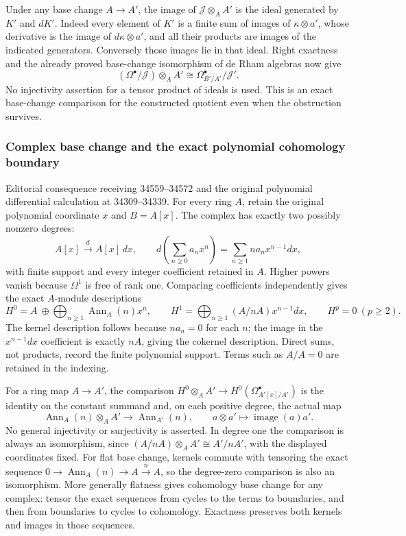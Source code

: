 Under any base change \(A\to A'\), the image of \(\mathcal J\otimes_A A'\) is the ideal generated by \(K'\) and \(dK'\). Indeed every element of \(K'\) is a finite sum of images of \(\kappa\otimes a'\), whose derivative is the image of \(d\kappa\otimes a'\), and all their products are images of the indicated generators. Conversely those images lie in that ideal. Right exactness and the already proved base-change isomorphism of de Rham algebras now give \[
(\Omega^\bullet/\mathcal J)\otimes_A A'
\cong \Omega_{B'/A'}^\bullet/\mathcal J'.
\] No injectivity assertion for a tensor product of ideals is used. This is an exact base-change comparison for the constructed quotient even when the obstruction survives.

\subsubsection{Complex base change and the exact polynomial cohomology boundary}\label{complex-base-change-and-the-exact-polynomial-cohomology-boundary}

Editorial consequence receiving 34559--34572 and the original polynomial differential calculation at 34309--34339. For every ring \(A\), retain the original polynomial coordinate \(x\) and \(B=A[x]\). The complex has exactly two possibly nonzero degrees: \[
A[x]\xrightarrow d A[x]\,dx,
\qquad d\left(\sum_{n\ge0}a_nx^n\right)=\sum_{n\ge1}n a_n x^{n-1}dx,
\] with finite support and every integer coefficient retained in \(A\). Higher powers vanish because \(\Omega^1\) is free of rank one. Comparing coefficients independently gives the exact \(A\)-module descriptions \[
H^0=A\ \oplus\!\bigoplus_{n\ge1}\operatorname{Ann}_A(n)x^n,
\qquad
H^1=\bigoplus_{n\ge1}(A/nA)x^{n-1}dx,
\qquad H^p=0\ (p\ge2).
\] The kernel description follows because \(n a_n=0\) for each \(n\); the image in the \(x^{n-1}dx\) coefficient is exactly \(nA\), giving the cokernel description. Direct sums, not products, record the finite polynomial support. Terms such as \(A/A=0\) are retained in the indexing.

For a ring map \(A\to A'\), the comparison \(H^0\otimes_A A'\to H^0(\Omega_{A'[x]/A'}^\bullet)\) is the identity on the constant summand and, on each positive degree, the actual map \[
\operatorname{Ann}_A(n)\otimes_A A'\longrightarrow\operatorname{Ann}_{A'}(n),\qquad a\otimes a'\longmapsto\operatorname{image}(a)a'.
\] No general injectivity or surjectivity is asserted. In degree one the comparison is always an isomorphism, since \((A/nA)\otimes_A A'\cong A'/nA'\), with the displayed coordinates fixed. For flat base change, kernels commute with tensoring the exact sequence \(0\to\operatorname{Ann}_A(n)\to A\xrightarrow n A\), so the degree-zero comparison is also an isomorphism. More generally flatness gives cohomology base change for any complex: tensor the exact sequences from cycles to the terms to boundaries, and then from boundaries to cycles to cohomology. Exactness preserves both kernels and images in those sequences.

